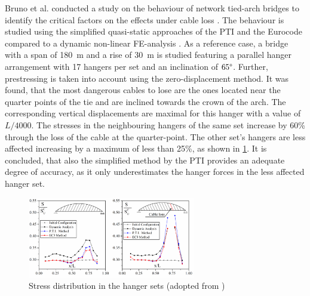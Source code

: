 Bruno et al. conducted a study on the behaviour of network tied-arch bridges to identify the critical factors on the effects under cable loss \cite{Bruno}. The behaviour is studied using the simplified quasi-static approaches of the PTI and the Eurocode compared to a dynamic non-linear FE-analysis \cite{PTI}. As a reference case, a bridge with a span of \SI{180}{m} and a rise of \SI{30}{m} is studied featuring a parallel hanger arrangement with 17 hangers per set and an inclination of $65 \degree$. Further, prestressing is taken into account using the zero-displacement method. It was found, that the most dangerous cables to lose are the ones located near the quarter points of the tie and are inclined towards the crown of the arch. The corresponding vertical displacements are maximal for this hanger with a value of $L/4000$. The stresses in the neighbouring hangers of the same set increase by 60\% through the loss of the cable at the quarter-point. The other set's hangers are less affected increasing by a maximum of less than 25\%, as shown in \cref{fig:Bruno}. It is concluded, that also the simplified method by the PTI provides an adequate degree of accuracy, as it only underestimates the hanger forces in the less affected hanger set.
\begin{figure}[H]
    \centering
    \includegraphics[width=0.65\textwidth]{Pictures/BrunoCableLoss.PNG}
    \caption{Stress distribution in the hanger sets (adopted from \cite{Bruno})}
    \label{fig:Bruno}
\end{figure}

